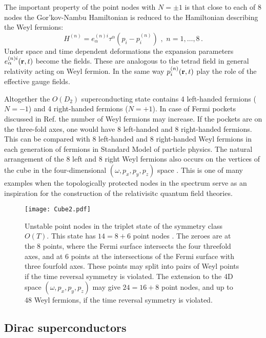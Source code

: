 \documentclass[prb,
superscriptaddress,showpacs,amsmath,amssymb]{revtex4}
\begin{document}
The important property of the point nodes with $N=\pm 1$ is that close to each of  8 nodes the Gor'kov-Nambu Hamiltonian is reduced to the Hamiltonian describing the Weyl fermions:
\begin{equation}
 H^{(n)}=
e^{{(n)}i}_\alpha \tau^\alpha \left(p_i -p_i^{(n)}  \right) \,\, ,\,\, n=1, \ldots ,8\,.
\label{Weyl}
\end{equation}
Under space and time dependent deformations the expansion parameters  $e^{{(n)}i}_\alpha({\bf r},t)$  become the fields. These are analogous to the tetrad field in general relativity acting on Weyl fermion. In the same way 
$p_i^{(n)}({\bf r},t)$ play the role of the effective gauge fields. 


Altogether the $O(D_2)$ superconducting state contains 4 left-handed fermions ($N=-1$)  and 4 right-handed fermions ($N=+1$). In case of Fermi pockets discussed in Ref. \cite{Agterberg1999} the number of Weyl fermions may increase. If the pockets are on the three-fold axes, one would have 8 left-handed and 8 right-handed fermions.
This can be compared with 8 left-handed and 8 right-handed Weyl fermions in each generation of fermions in Standard Model of particle physics. The natural arrangement of the 8 left and 8 right Weyl fermions also occurs on the vertices of the cube in the four-dimensional $(\omega,p_x,p_y,p_z)$ space \cite{Creutz2008,Creutz2014}.
This is one of many examples when the topologically protected nodes in the spectrum serve as an inspiration
for the construction of the relativisitc quantum field theories.

\begin{figure}[top]
\centerline{\texttt{[image: Cube2.pdf]}}
\label{Cube2} 
  \caption{Unstable point nodes in the triplet state of the symmetry class $O(T)$.
  This state has $14=8+6$ point nodes \cite{VolovikGorkov1985}. The zeroes are at the 8 points, where the Fermi surface intersects the four threefold axes, and at 6 points at the intersections of the Fermi surface with three fourfold axes. These points may split into pairs of Weyl points if the time reversal symmetry is violated. The extension to the 4D space $(\omega,p_x,p_y,p_z)$ may give $24=16+8$ point nodes, and up to 48 Weyl fermions, if the time reversal symmetry is violated.
 }
\end{figure}


\subsection{Dirac superconductors}
\label{DiracSuperconductor}
\end{document}
